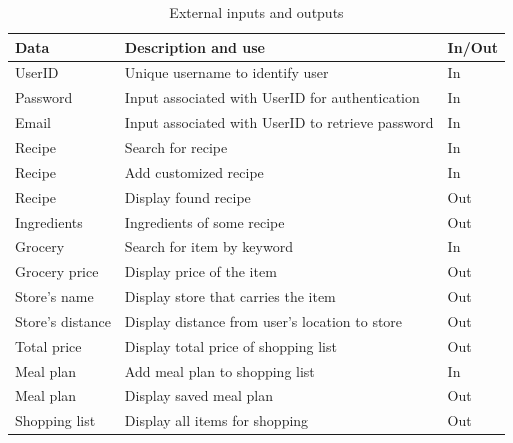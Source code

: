 \begin{table}[H]
\centering
\begin{tabular}{|l|l|l|}
\hline
\textbf {Data}      & \textbf{Description and use}  & \textbf{In/Out} \\
\hline
UserID & Unique username to identify user & In     \\
\hline
Password & Input associated with UserID for authentication & In       \\
\hline
Email & Input associated with UserID to retrieve password & In      \\
\hline
Recipe & Search for recipe  & In       \\
\hline
Recipe & Add customized recipe  & In       \\
\hline
Recipe & Display found recipe  & Out       \\
\hline
Ingredients & Ingredients of some recipe & Out       \\
\hline
Grocery & Search for item by keyword  & In     \\
\hline
Grocery price & Display price of the item & Out          \\
\hline
Store's name & Display store that carries the item & Out       \\
\hline
Store's distance & Display distance from user's location to store & Out \\
\hline
Total price & Display total price of shopping list & Out \\
\hline
Meal plan &  Add meal plan to shopping list & In       \\
\hline
Meal plan &  Display saved meal plan  & Out       \\
\hline
Shopping list & Display all items for shopping & Out        \\
\hline
\end{tabular}
\caption{External inputs and outputs}
\end{table}


